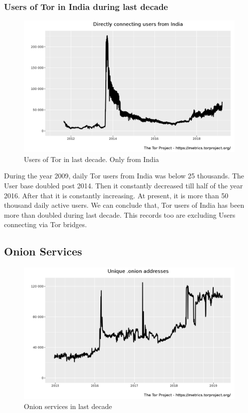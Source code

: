 \documentclass{article}
\begin{document}
    \subsubsection{Users of Tor in India during last decade}
      \begin{figure}[h!]
        \includegraphics[width=\linewidth]{userstats-relay-country-india-last-decade.png}
        \caption{Users of Tor in last decade. Only from India}
        \label{fig:users_of_tor_from_india_last_decade}
      \end{figure}

      During the year 2009, daily Tor users from India was below 25 thousands.
      The User base doubled post 2014. Then it constantly decreased till half of
      the year 2016. After that it is constantly increasing. At present, it is
      more than 50 thousand daily active users. We can conclude that, Tor users
      of India has been more than doubled during last decade. This records too
      are excluding Users connecting via Tor bridges.

  \subsection{Onion Services}
    \begin{figure}[h!]
      \includegraphics[width=\linewidth]{onion-addresses-in-last-decade.png}
      \caption{Onion services in last decade}
      \label{fig:onion_service_in_last_decade}
    \end{figure}
\end{document}

